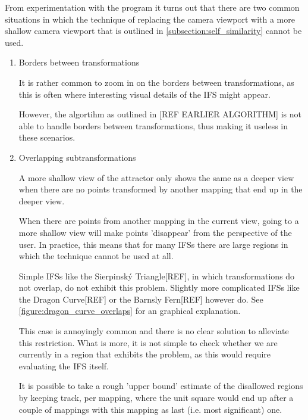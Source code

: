 \documentclass[11pt]{article}
\begin{document}
From experimentation with the program it turns out that there are two common situations
in which the technique of replacing the camera viewport with a more shallow camera viewport that is outlined in \autoref{subsection:self_similarity} cannot be used.

\begin{enumerate}
\item Borders between transformations
\label{sec:org934c1ba}

It is rather common to zoom in on the borders between transformations, as this is often
where interesting visual details of the IFS might appear.

However, the algortihm as outlined in [REF EARLIER ALGORITHM] is not able to handle borders between transformations,
thus making it useless in these scenarios.

\item Overlapping subtransformations
\label{sec:org1aebb40}

A more shallow view of the attractor only shows the same as a deeper view when
there are no points transformed by another mapping that end up in the deeper view.

When there are points from another mapping in the current view, 
going to a more shallow view will make points 'disappear' from the perspective of the user.
In practice, this means that for many IFSs there are large regions in which the technique cannot be used at all.

Simple IFSs like the Sierpinský Triangle[REF], in which transformations
do not overlap, do not exhibit this problem. 
Slightly more complicated IFSs like the Dragon Curve[REF] or the Barnsly Fern[REF] however do.
See \autoref{figure:dragon_curve_overlaps} for an graphical explanation.

This case is annoyingly common and there is no clear solution to alleviate this restriction.
What is more, it is not simple to check whether we are currently in a region that exhibits the problem,
as this would require evaluating the IFS itself.

It is possible to take a rough 'upper bound' estimate of the disallowed regions by keeping track, 
per mapping, where the unit square would end up after a couple of mappings with this mapping as last (i.e. most significant) one.



\end{enumerate}
\end{document}
